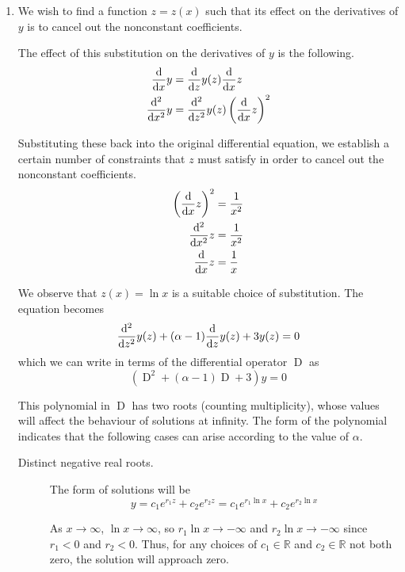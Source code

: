 \documentclass[letterpaper,11pt]{article}
\DeclareMathOperator{\D}{D}
\newcommand{\R}{\mathbb{R}}
\newcommand{\deriv}[1]{{\ensuremath \frac{\mathrm{d}}{\mathrm{d}#1}}}
\newcommand{\nderiv}[2]{{\ensuremath \frac{\mathrm{d}^#1}{\mathrm{d}#2^#1}}}
\begin{document}
\begin{enumerate}
    \item
        We wish to find a function $z = z(x)$ such that its effect on the
        derivatives of $y$ is to cancel out the nonconstant coefficients.

        The effect of this substitution on the derivatives of $y$ is the
        following.
        \begin{align*}
            \deriv{x} y &= \deriv{z} y(z) \deriv{x} z \\
            \nderiv{2}{x} y &= \nderiv{2}{z} y(z) \left(\deriv{x} z\right)^2
        \end{align*}

        Substituting these back into the original differential equation, we
        establish a certain number of constraints that $z$ must satisfy in
        order to cancel out the nonconstant coefficients.
        \begin{align*}
            \left(\deriv{x} z\right)^2 &= \frac{1}{x^2} \\
            \nderiv{2}{x} z &= \frac{1}{x^2} \\
            \deriv{x} z &= \frac{1}{x}
        \end{align*}

        We observe that $z(x) = \ln x$ is a suitable choice of substitution.
        The equation becomes
        $$ \nderiv{2}{z} y(z) + (\alpha - 1) \deriv{z} y(z) + 3 y(z) = 0 $$
        which we can write in terms of the differential operator $\D{}$ as
        $$ \left( \D^2{} + (\alpha - 1) \D{} + 3 \right)y = 0 $$

        This polynomial in $\D{}$ has two roots (counting multiplicity), whose
        values will affect the behaviour of solutions at infinity. The form of
        the polynomial indicates that the following cases can arise according
        to the value of $\alpha$.

        \begin{description}
            \item[Distinct negative real roots.]

                The form of solutions will be
                \begin{equation*}
                    y = c_1 e^{r_1 z} + c_2 e^{r_2 z}
                    = c_1 e^{r_1 \ln x} + c_2 e^{r_2 \ln x}
                \end{equation*}

                As $x \to \infty$, $\ln x \to \infty$, so
                $r_1 \ln x \to - \infty$ and $r_2 \ln x \to -\infty$ since
                $r_1 < 0$ and $r_2 < 0$. Thus, for any choices of $c_1 \in \R$
                and $c_2 \in \R$ not both zero, the solution will approach
                zero.


\end{description}
\end{enumerate}
\end{document}
